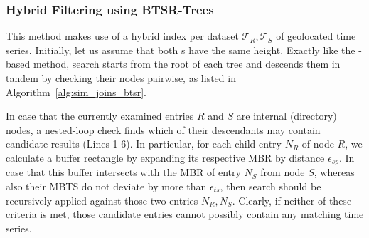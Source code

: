 \subsubsection{Hybrid Filtering using BTSR-Trees}
\label{subsec:btsr_appr}

This method makes use of a hybrid \btsr index per dataset $\mathcal{T}_{R}, \mathcal{T}_{S}$ of geolocated time series. Initially, let us assume that both {\btsr}s have the same height. Exactly like the  \isax-based method, search starts from the root of each tree and descends them in tandem by checking their nodes pairwise, as listed in Algorithm~\ref{alg:sim_joins_btsr}.


In case that the currently examined entries $R$ and $S$ are internal (directory) nodes, a nested-loop check finds which of their descendants may contain candidate results (Lines 1-6). In particular, for each child entry $N_R$ of node $R$, we calculate a buffer rectangle by expanding its respective MBR by distance $\epsilon_{sp}$. In case that this buffer intersects with the MBR of entry $N_S$ from node $S$, whereas also their MBTS do not deviate by more than $\epsilon_{ts}$, then search should be recursively applied against those two entries $N_R, N_S$. Clearly, if neither of these criteria is met, those candidate entries cannot possibly contain any matching time series. 




